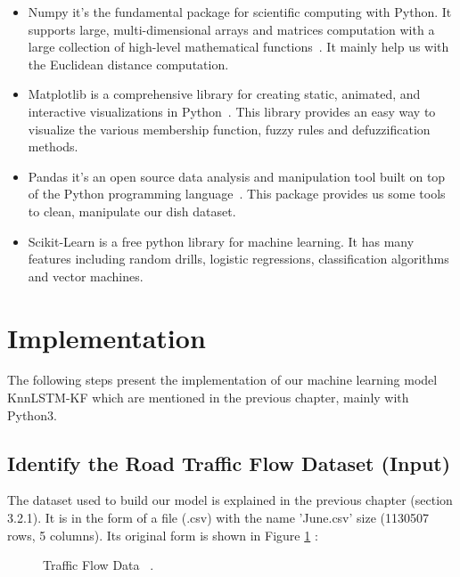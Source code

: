 \begin{itemize}
	
	\item Numpy it’s the fundamental package for scientific computing with Python. It supports large, multi-dimensional arrays and matrices computation with a large collection of high-level mathematical functions~\cite{Numpy_site}. It mainly help us with the Euclidean distance
	computation.
	
	\item Matplotlib is a comprehensive library for creating static, animated, and interactive visualizations in Python~\cite{Matplotlib_site}. This library provides an easy way to visualize the
	various membership function, fuzzy rules and defuzzification methods.
	
	\item Pandas it’s an open source data analysis and manipulation tool built on top of the Python programming language~\cite{Pandas_site}. This package provides us some tools to clean, manipulate our dish dataset.
	
	\item Scikit-Learn is a free python library for machine learning. It has many features including random drills, logistic regressions, classification algorithms and vector machines.
	
\end{itemize}

\section{Implementation}
The following steps present the implementation of our machine learning model KnnLSTM-KF which are mentioned in the previous chapter, mainly with Python3. 

\subsection{Identify the Road Traffic Flow Dataset (Input)}
The dataset used to build our model is explained in the previous chapter (section 3.2.1). It is in the form of a file (.csv) with the name 'June.csv' size (1130507 rows, 5 columns). Its original form is shown in Figure \ref{Traffic Flow Data} : 


\begin{figure}[!h]
	\begin{center}
	\end{center}
	\caption{Traffic Flow Data  ~\cite{dataset_for_traffic_speed_prediction}.}
	\label{Traffic Flow Data}
\end{figure} 

